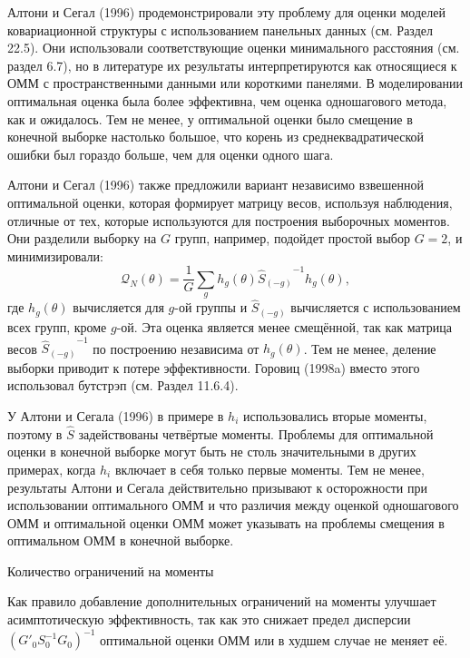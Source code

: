 Алтони и Сегал (1996) продемонстрировали эту проблему для оценки моделей ковариационной
структуры с использованием панельных данных (см. Раздел 22.5). Они использовали соответствующие оценки минимального расстояния (см. раздел 6.7), но в литературе их результаты интерпретируются как относящиеся к ОММ с пространственными данными или короткими панелями. В моделировании оптимальная оценка была более эффективна, чем оценка одношагового метода, как и ожидалось. Тем не менее, у оптимальной оценки было смещение в конечной выборке настолько большое, что корень из среднеквадратической ошибки был гораздо больше, чем для оценки одного шага.

Алтони и Сегал (1996) также предложили вариант независимо взвешенной оптимальной оценки, которая формирует матрицу весов, используя наблюдения, отличные от тех, которые используются для построения выборочных моментов. Они разделили выборку на $G$ групп, например, подойдет простой выбор $G=2$, и минимизировали:
\begin{equation}
\mathcal{Q}_{N}(\theta)= \frac{1}{G} \sum_g h_g(\theta) {\hat{S}_{(-g)}}^{-1} h_g(\theta),
\end{equation}
где $h_g(\theta)$ вычисляется для $g$-ой группы и $\hat{S}_{(-g)}$ вычисляется с использованием всех групп, кроме $g$-ой. Эта оценка является менее смещённой, так как матрица весов ${\hat{S}_{(-g)}}^{-1}$ по построению независима от $h_g(\theta)$. Тем не менее, деление выборки приводит к потере эффективности. Горовиц (1998a) вместо этого использовал бутстрэп (см. Раздел 11.6.4). 

У Алтони и Сегала (1996) в примере в $h_i$ использовались вторые моменты, поэтому в $\hat{S}$ задействованы четвёртые моменты. Проблемы для оптимальной оценки в конечной выборке могут быть не столь значительными в других примерах, когда $h_i$ включает в себя только первые моменты. Тем не менее, результаты Алтони и Сегала действительно призывают к осторожности при использовании оптимального ОММ и что различия между оценкой одношагового ОММ и оптимальной оценки ОММ может указывать на проблемы смещения в оптимальном ОММ в конечной выборке.

\begin{center}
Количество ограничений на моменты
\end{center}

Как правило добавление дополнительных ограничений на моменты улучшает асимптотическую эффективность, так как это снижает предел дисперсии $(G'_0 S^{-1}_0 G_0)^{-1}$ оптимальной оценки ОММ или в худшем случае не меняет её.

